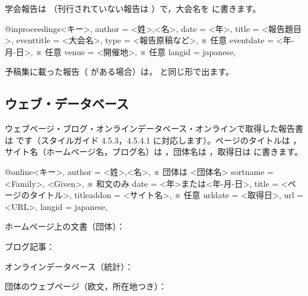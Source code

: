 
学会報告は （刊行されていない報告は ）で，大会名を  に書きます。

\begin{bibtemplate}
@inproceedings{<キー>,
  author     = {<姓>,<名>},
  date       = {<年>},
  title      = {<報告題目>},
  eventtitle = {<大会名>},
  type       = {<報告原稿など>},   ※ 任意
  eventdate  = {<年-月-日>},        ※ 任意
  venue      = {<開催地>},          ※ 任意
  langid     = {japanese},
}
\end{bibtemplate}


予稿集に載った報告（ がある場合）は， と同じ形で出ます。


\subsection{ウェブ・データベース}\label{sec:web}
ウェブページ・ブログ・オンラインデータベース・オンラインで取得した報告書は  です（スタイルガイド 4.5.3，4.5.4.1 に対応します）。ページのタイトルは ，サイト名（ホームページ名，ブログ名）は ，団体名は ，取得日は  に書きます。

\begin{bibtemplate}
@online{<キー>,
  author     = {<姓>,<名>},      ※ 団体は {{<団体名>}}
  sortname   = {<Family>, <Given>},   ※ 和文のみ
  date       = {<年>または<年-月-日>},
  title      = {<ページのタイトル>},
  titleaddon = {<サイト名>},      ※ 任意
  urldate    = {<取得日>},
  url        = {<URL>},
  langid     = {japanese},
}
\end{bibtemplate}

ホームページ上の文書（団体）：


ブログ記事：



オンラインデータベース（統計）：


団体のウェブページ（欧文，所在地つき）：

